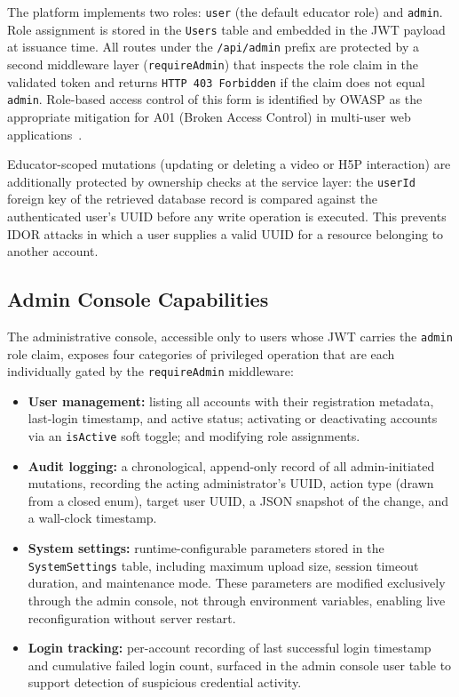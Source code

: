 The platform implements two roles: \texttt{user} (the default educator role)
and \texttt{admin}. Role assignment is stored in the \texttt{Users} table
and embedded in the JWT payload at issuance time. All routes under the
\texttt{/api/admin} prefix are protected by a second middleware layer
(\texttt{requireAdmin}) that inspects the role claim in the validated token
and returns \texttt{HTTP~403 Forbidden} if the claim does not equal
\texttt{admin}. Role-based access control of this form is identified by
OWASP as the appropriate mitigation for A01 (Broken Access Control) in
multi-user web applications~\cite{owasp2021}.

Educator-scoped mutations (updating or deleting a video or H5P interaction)
are additionally protected by ownership checks at the service layer: the
\texttt{userId} foreign key of the retrieved database record is compared
against the authenticated user's UUID before any write operation is executed.
This prevents IDOR attacks in which a user supplies a valid UUID for a
resource belonging to another account.

\subsection{Admin Console Capabilities}

The administrative console, accessible only to users whose JWT carries the
\texttt{admin} role claim, exposes four categories of privileged operation
that are each individually gated by the \texttt{requireAdmin} middleware:

\begin{itemize}
  \item \textbf{User management:} listing all accounts with their
  registration metadata, last-login timestamp, and active status; activating
  or deactivating accounts via an \texttt{isActive} soft toggle; and
  modifying role assignments.

  \item \textbf{Audit logging:} a chronological, append-only record of all
  admin-initiated mutations, recording the acting administrator's UUID,
  action type (drawn from a closed enum), target user UUID, a JSON snapshot
  of the change, and a wall-clock timestamp.

  \item \textbf{System settings:} runtime-configurable parameters stored in
  the \texttt{SystemSettings} table, including maximum upload size, session
  timeout duration, and maintenance mode. These parameters are modified
  exclusively through the admin console, not through environment variables,
  enabling live reconfiguration without server restart.

  \item \textbf{Login tracking:} per-account recording of last successful
  login timestamp and cumulative failed login count, surfaced in the admin
  console user table to support detection of suspicious credential activity.
\end{itemize}

